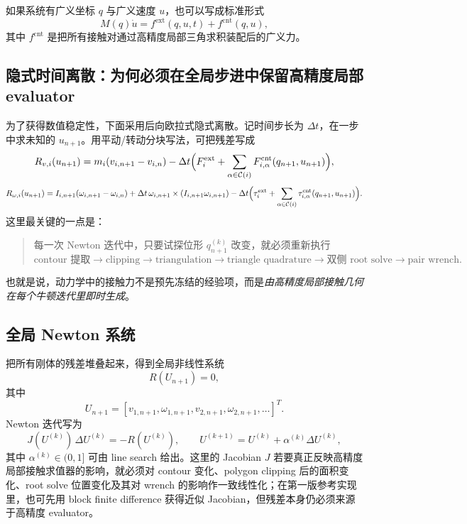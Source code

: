 \documentclass[12pt,a4paper]{ctexart}
\begin{document}
如果系统有广义坐标 $q$ 与广义速度 $u$，也可以写成标准形式
\begin{equation}
    M(q)\dot u = f^{\mathrm{ext}}(q,u,t) + f^{\mathrm{cnt}}(q,u),
\end{equation}
其中 $f^{\mathrm{cnt}}$ 是把所有接触对通过高精度局部三角求积装配后的广义力。

\subsection{隐式时间离散：为何必须在全局步进中保留高精度局部 evaluator}

为了获得数值稳定性，下面采用后向欧拉式隐式离散。记时间步长为 $\Delta t$，在一步中求未知的 $u_{n+1}$。用平动/转动分块写法，可把残差写成
\begin{equation}
    R_{v,i}(u_{n+1}) = m_i (v_{i,n+1}-v_{i,n}) - \Delta t\Bigl(F_i^{\mathrm{ext}} + \sum_{\alpha\in\mathcal C(i)} F_{i,\alpha}^{\mathrm{cnt}}(q_{n+1},u_{n+1})\Bigr),
\end{equation}
\begin{equation}
    R_{\omega,i}(u_{n+1}) = I_{i,n+1}(\omega_{i,n+1}-\omega_{i,n}) + \Delta t\,\omega_{i,n+1}\times(I_{i,n+1}\omega_{i,n+1})
    - \Delta t\Bigl(\tau_i^{\mathrm{ext}} + \sum_{\alpha\in\mathcal C(i)} \tau_{i,\alpha}^{\mathrm{cnt}}(q_{n+1},u_{n+1})\Bigr).
\end{equation}
这里最关键的一点是：
\begin{quote}
每一次 Newton 迭代中，只要试探位形 $q_{n+1}^{(k)}$ 改变，就必须重新执行
\[\text{contour 提取} \to \text{clipping} \to \text{triangulation} \to \text{triangle quadrature} \to \text{双侧 root solve} \to \text{pair wrench}.\]
\end{quote}
也就是说，动力学中的接触力不是预先冻结的经验项，而是\emph{由高精度局部接触几何在每个牛顿迭代里即时生成}。

\subsection{全局 Newton 系统}

把所有刚体的残差堆叠起来，得到全局非线性系统
\begin{equation}
    R(U_{n+1}) = 0,
\end{equation}
其中
\begin{equation}
    U_{n+1} = [v_{1,n+1},\omega_{1,n+1},v_{2,n+1},\omega_{2,n+1},\dots]^T.
\end{equation}
Newton 迭代写为
\begin{equation}
    J(U^{(k)})\,\Delta U^{(k)} = -R(U^{(k)}),
    \qquad
    U^{(k+1)} = U^{(k)} + \alpha^{(k)}\Delta U^{(k)},
\end{equation}
其中 $\alpha^{(k)}\in(0,1]$ 可由 line search 给出。这里的 Jacobian $J$ 若要真正反映高精度局部接触求值器的影响，就必须对 contour 变化、polygon clipping 后的面积变化、root solve 位置变化及其对 wrench 的影响作一致线性化；在第一版参考实现里，也可先用 block finite difference 获得近似 Jacobian，但残差本身仍必须来源于高精度 evaluator。
\end{document}
